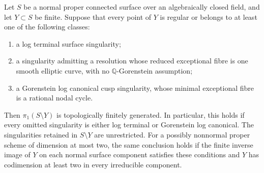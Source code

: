 \begin{corollary}
\label{D:Gorenstein-lc-boundary}
Let $S$ be a normal proper connected surface over an algebraically
closed field, and let $Y\subset S$ be finite.  Suppose that every
point of $Y$ is regular or belongs to at least one of the following
classes:
\begin{enumerate}
\item a log terminal surface singularity;
\item a singularity admitting a resolution whose reduced exceptional
fibre is one smooth elliptic curve, with no $\mathbb Q$-Gorenstein
assumption;
\item a Gorenstein log canonical cusp singularity, whose minimal
exceptional fibre is a rational nodal cycle.
\end{enumerate}
Then $\pi_1(S\setminus Y)$ is topologically finitely generated.
In particular, this holds if every omitted singularity is either
log terminal or Gorenstein log canonical.  The singularities
retained in $S\setminus Y$ are unrestricted.
For a possibly nonnormal proper scheme of dimension at most two,
the same conclusion holds if the finite inverse image of $Y$ on
each normal surface component satisfies these conditions and $Y$
has codimension at least two in every irreducible component.
\end{corollary}
